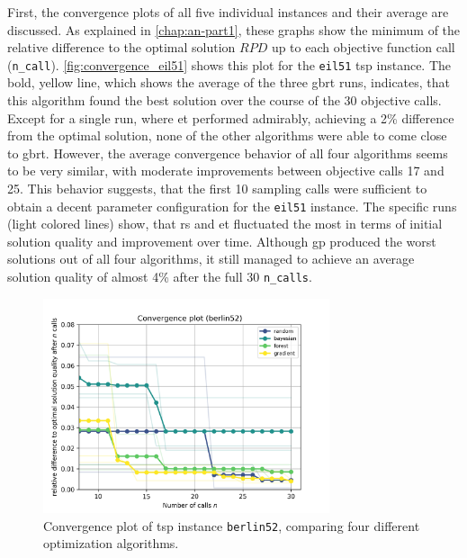 First, the convergence plots of all five individual instances and their average are discussed. As explained in \cref{chap:an-part1}, these graphs show the minimum of the relative difference to the optimal solution $RPD$ up to each objective function call (\texttt{n\_call}). \cref{fig:convergence_eil51} shows this plot for the \texttt{eil51} \gls{tsp} instance. The bold, yellow line, which shows the average of the three \gls{gbrt} runs, indicates, that this algorithm found the best solution over the course of the 30 objective calls. Except for a single run, where \gls{et} performed admirably, achieving a 2\% difference from the optimal solution, none of the other algorithms were able to come close to \gls{gbrt}. However, the average convergence behavior of all four algorithms seems to be very similar, with moderate improvements between objective calls 17 and 25. This behavior suggests, that the first 10 sampling calls were sufficient to obtain a decent parameter configuration for the \texttt{eil51} instance. The specific runs (light colored lines) show, that \gls{rs} and \gls{et} fluctuated the most in terms of initial solution quality and improvement over time. Although \gls{gp} produced the worst solutions out of all four algorithms, it still managed to achieve an average solution quality of almost 4\% after the full 30 \texttt{n\_calls}.

\begin{figure}[h]
	\centering
	\includegraphics[width=0.75\textwidth]{results/part1/convergence_berlin52.png}
	\caption[Convergence plot of \gls{tsp} instance \texttt{berlin52}]{Convergence plot of \gls{tsp} instance \texttt{berlin52}, comparing four different optimization algorithms.}
	\label{fig:convergence_berlin52}
\end{figure}

